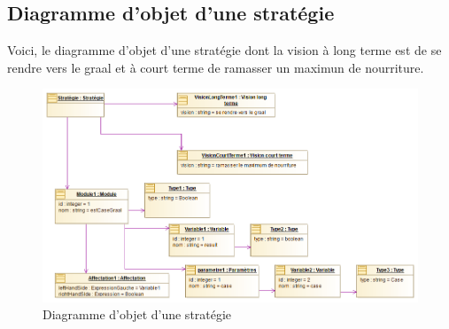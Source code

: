 
\subsection{Diagramme d'objet d'une stratégie}
\label{sec:question-21}

Voici, le diagramme d'objet d'une stratégie dont la vision à long terme est de se rendre vers le graal et à court terme de ramasser un maximun de nourriture.

\begin{figure}[h!]
	\centering
	\includegraphics[width=500pt]{assets/diagramme_objet_strat}
	\caption{Diagramme d'objet d'une stratégie}
	\label{fig:diagramme_objet_strat}
\end{figure}

\newpage